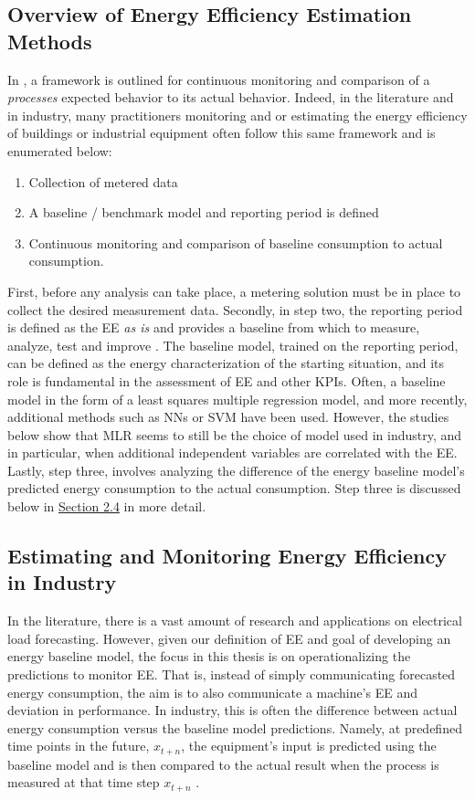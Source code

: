 \subsection{Overview of Energy Efficiency Estimation Methods}

In \cite{kini_methodology_2011}, a framework is outlined for continuous monitoring and comparison of a \textit{processes} expected behavior to its actual behavior. Indeed, in the literature and in industry, many practitioners monitoring and or estimating the energy efficiency of buildings or industrial equipment often follow this same framework and is enumerated below: 

\begin{enumerate}
    \item Collection of metered data
    \item A baseline / benchmark model and reporting period is defined
    \item Continuous monitoring and comparison of baseline consumption to actual consumption.
\end{enumerate}

First, before any analysis can take place, a metering solution must be in place to collect the desired measurement data. Secondly, in step two, the reporting period is defined as the EE \textit{as is} and provides a baseline from which to measure, analyze, test and improve \cite{oakland_statistical_2008}. The baseline model, trained on the reporting period, can be defined as the energy characterization of the starting situation, and its role is fundamental in the assessment of EE and other \ac{KPIs}. Often, a baseline model in the form of a least squares multiple regression model, and more recently, additional methods such as \ac{NNs} or \ac{SVM} have been used. However, the studies below show that  \ac{MLR} seems to still be the choice of model used in industry, and in particular, when additional independent variables are correlated with the EE. Lastly, step three, involves analyzing the difference of the energy baseline model's predicted energy consumption to the actual consumption. Step three is discussed below in \hyperlink{subsection.2.4}{Section 2.4} in more detail.

\subsection{Estimating and Monitoring Energy Efficiency in Industry}

In the literature, there is a vast amount of research and applications on electrical load forecasting. However, given our definition of EE and goal of developing an energy baseline model, the focus in this thesis is on operationalizing the predictions to monitor EE. That is, instead of simply communicating forecasted energy consumption, the aim is to also communicate a machine's EE and deviation in performance. In industry, this is often the difference between actual energy consumption versus the baseline model predictions. Namely, at predefined time points in the future, $x_{t+n}$, the equipment's input is predicted using the baseline model and is then compared to the actual result when the process is measured at that time step $x_{t+n}$ \cite{tightening}. 

